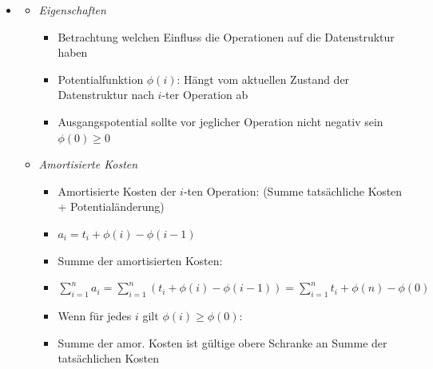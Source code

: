 \documentclass[
    12pt,
    a4paper,
    ngerman,
    color=3b,%
    marginpar=false,
    colorback=false,
    leqno,
]{tudaexercise}
\begin{document}
\begin{itemize}
        \item {}
            \begin{itemize}
                \item \textit{Eigenschaften}
                    \begin{itemize}
                        \item Betrachtung welchen Einfluss die Operationen auf die Datenstruktur haben
                        \item Potentialfunktion $\phi(i)$: Hängt vom aktuellen Zustand der Datenstruktur nach $i$-ter Operation ab
                        \item Ausgangspotential sollte vor jeglicher Operation nicht negativ sein $\phi(0) \geq 0$
                    \end{itemize}

                \item \textit{Amortisierte Kosten}
                    \begin{itemize}
                        \item Amortisierte Kosten der $i$-ten Operation: (Summe tatsächliche Kosten + Potentialänderung)
                        \item[] $a_i = t_i + \phi(i) - \phi(i-1)$
                        \item Summe der amortisierten Kosten:
                        \item[] $\sum^n_{i=1} a_i = \sum^n_{i=1} (t_i + \phi(i) - \phi(i - 1)) = \sum^n_{i=1} t_i + \phi(n) - \phi(0)$
                        \item Wenn für jedes $i$ gilt $\phi(i) \geq \phi(0)$:
                        \item[] Summe der amor. Kosten ist gültige obere Schranke an Summe der tatsächlichen Kosten 
                    \end{itemize}


\end{itemize}
\end{itemize}
\end{document}
